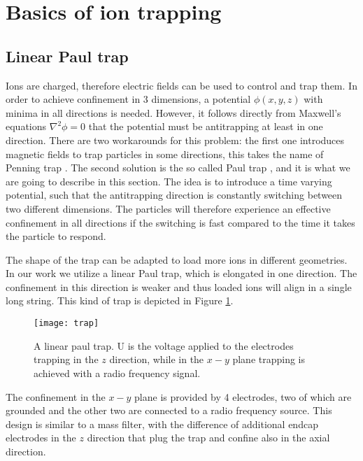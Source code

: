 
\section{Basics of ion trapping}
\subsection{Linear Paul trap}
Ions are charged, therefore electric fields can be used to control and trap them. In order to achieve confinement in 3 dimensions, a potential $\phi(x,y,z)$ with minima in all directions is needed. However, it follows directly from Maxwell's equations $\nabla^2 \phi = 0$ that the potential must be antitrapping at least in one direction. There are two workarounds for this problem: the first one introduces magnetic fields to trap particles in some directions, this takes the name of Penning trap \cite{RevModPhys.58.233}. The second solution is the so called Paul trap \cite{RevModPhys.62.531}, and it is what we are going to describe in this section. The idea is to introduce a time varying potential, such that the antitrapping direction is constantly switching between two different dimensions. The particles will therefore experience an effective confinement in all directions if the switching is fast compared to the time it takes the particle to respond.\par
The shape of the trap can be adapted to load more ions in different geometries. In our work we utilize a linear Paul trap, which is elongated in one direction. The confinement in this direction is weaker and thus loaded ions will align in a single long string. This kind of trap is depicted in Figure \ref{trap}.
\begin{figure}
\centering
\texttt{[image: trap]}
\caption{A linear paul trap. U is the voltage applied to the electrodes trapping in the $z$ direction, while in the $x-y$ plane trapping is achieved with a radio frequency signal.}
\label{trap}
\end{figure}
The confinement in the $x-y$ plane is provided by 4 electrodes, two of which are grounded and the other two are connected to a radio frequency source. This design is similar to a mass filter, with the difference of additional endcap electrodes in the $z$ direction that plug the trap and confine also in the axial direction.\par
